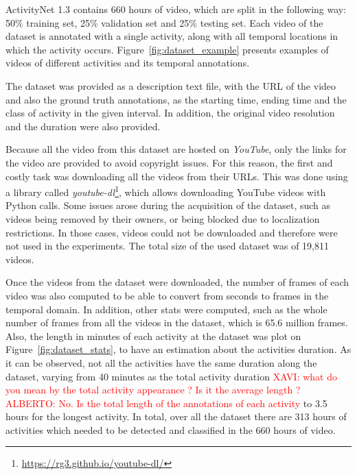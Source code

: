 ActivityNet 1.3 contains 660 hours of video, which are split in the following way: 50\% training set, 25\% validation set and 25\% testing set. Each video of the dataset is annotated with a single activity, along with all temporal locations in which the activity occurs. Figure~\ref{fig:dataset_example} presents examples of videos of different activities and its temporal annotations.

The dataset was provided as a description text file, with the URL of the video and also the ground truth annotations, as the starting time, ending time and the class of activity in the  given interval. In addition, the original video resolution and the duration were also provided.

Because all the video from this dataset are hosted on \textit{YouTube}, only the links for the video are provided to avoid copyright issues. For this reason, the first and costly task was downloading all the videos from their URLs. This was done using a library called \textit{youtube-dl}\footnote{\url{https://rg3.github.io/youtube-dl/}}, which allows downloading YouTube videos with Python calls. Some issues arose during the acquisition of the dataset, such as videos being removed by their owners, or being blocked due to localization restrictions. In those cases, videos could not be downloaded and therefore were not used in the experiments. The total size of the used dataset was of 19,811 videos.


Once the videos from the dataset were downloaded, the number of frames of each video was also computed to be able to convert from seconds to frames in the temporal domain. 
In addition, other stats were computed, such as the whole number of frames from all the videos in the dataset, which is 65.6 million frames. Also, the length in minutes of each activity at the dataset was plot on Figure~\ref{fig:dataset_stats}, to have an estimation about the activities duration. As it can be observed, not all the activities have the same duration along the dataset, varying from 40 minutes as the total activity duration \textcolor{red}{XAVI: what do you mean by the total activity appearance ? Is it the average length ? ALBERTO: No. Is the total length of the annotations of each activity} to 3.5 hours for the longest activity. In total, over all the dataset there are 313 hours of activities which needed to be detected and classified in the 660 hours of video.

